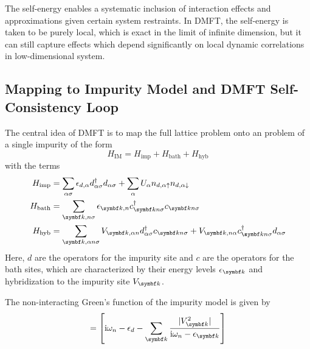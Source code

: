 \documentclass[../notes.tex]{subfiles}
\begin{document}
The self-energy enables a systematic inclusion of interaction effects and approximations given certain system restraints.
In DMFT, the self-energy is taken to be purely local, which is exact in the limit of infinite dimension, but it can still capture effects which depend significantly on local dynamic correlations in low-dimensional system.

\subsection*{Mapping to Impurity Model and DMFT Self-Consistency Loop}

The central idea of DMFT is to map the full lattice problem onto an problem of a single impurity of the form
\begin{equation}
	H_{\mathrm{IM}} = H_{\mathrm{imp}} + H_{\mathrm{bath}} + H_{\mathrm{hyb}}
\end{equation}
with the terms
\begin{align}
	H_{\mathrm{imp}} &= \sum_{\alpha \sigma} \epsilon_{d, \alpha} d_{\alpha \sigma}^{\dagger} d_{\alpha \sigma} + \sum_{\alpha} U_{\alpha} n_{d, \alpha \uparrow} n_{d, \alpha \downarrow} \\
	H_{\mathrm{bath}} &= \sum_{\vb{k}, n \sigma} \epsilon_{\vb{k}, n} c_{\vb{k} n \sigma}^{\dagger} c_{\vb{k} n \sigma}  \\
	H_{\mathrm{hyb}} &= \sum_{\vb{k}, \alpha n \sigma} V_{\vb{k}, \alpha n} d_{\alpha \sigma}^{\dagger} c_{\vb{k} n \sigma} + V_{\vb{k}, n \alpha} c_{\vb{k} n \sigma}^{\dagger} d_{\alpha \sigma}
\end{align}
Here, \(d\) are the operators for the impurity site and \(c\) are the operators for the bath sites, which are characterized by their energy levels \(\epsilon_{\vb{k}}\) and hybridization to the impurity site \(V_{\vb{k}}\). 

The non-interacting Green's function of the impurity model is given by
\begin{equation}
	[G_{\mathrm{imp}, 0}] = \left[\iu \omega_n - \epsilon_{d} - \sum_{\vb{k}} \frac{\vert V_{\vb{k}}^2 \vert}{\iu \omega_n - \epsilon_{\vb{k}}} \right]
\end{equation}
\end{document}
